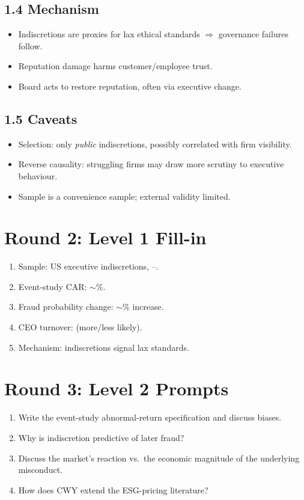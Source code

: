 \documentclass[11pt]{article}
\newcommand{\blank}[1]{\underline{\hspace{#1}}}
\begin{document}
\subsection*{1.4 Mechanism}
\begin{itemize}
\item Indiscretions are proxies for lax ethical standards $\Rightarrow$ governance failures follow.
\item Reputation damage harms customer/employee trust.
\item Board acts to restore reputation, often via executive change.
\end{itemize}

\subsection*{1.5 Caveats}
\begin{alertbox}
\begin{itemize}
\item Selection: only \emph{public} indiscretions, possibly correlated with firm visibility.
\item Reverse causality: struggling firms may draw more scrutiny to executive behaviour.
\item Sample is a convenience sample; external validity limited.
\end{itemize}
\end{alertbox}

\section*{Round 2: Level 1 Fill-in}
\begin{enumerate}
\item Sample: \blank{1cm} US executive indiscretions, \blank{1cm}--\blank{1cm}.
\item Event-study CAR: $\sim$\blank{1cm}\%.
\item Fraud probability change: $\sim$\blank{1cm}\% increase.
\item CEO turnover: \blank{1cm} (more/less likely).
\item Mechanism: indiscretions signal lax \blank{1cm} standards.
\end{enumerate}

\section*{Round 3: Level 2 Prompts}
\begin{enumerate}
\item Write the event-study abnormal-return specification and discuss biases.
\item Why is indiscretion predictive of later fraud?
\item Discuss the market's reaction vs.\ the economic magnitude of the underlying misconduct.
\item How does CWY extend the ESG-pricing literature?
\end{enumerate}
\end{document}
